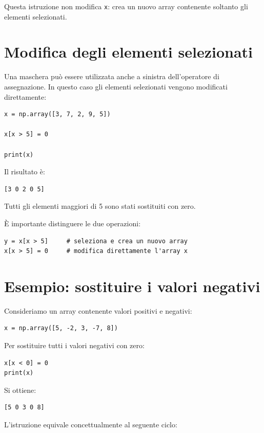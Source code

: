 \documentclass[11pt,a4paper]{book}
\begin{document}
Questa istruzione non modifica \texttt{x}: crea un nuovo array contenente soltanto gli elementi selezionati.

\section{Modifica degli elementi selezionati}

Una maschera può essere utilizzata anche a sinistra dell'operatore di assegnazione. In questo caso gli elementi selezionati vengono modificati direttamente:

\begin{lstlisting}
x = np.array([3, 7, 2, 9, 5])

x[x > 5] = 0

print(x)
\end{lstlisting}

Il risultato è:

\begin{lstlisting}
[3 0 2 0 5]
\end{lstlisting}

Tutti gli elementi maggiori di 5 sono stati sostituiti con zero.

È importante distinguere le due operazioni:

\begin{lstlisting}
y = x[x > 5]     # seleziona e crea un nuovo array
x[x > 5] = 0     # modifica direttamente l'array x
\end{lstlisting}

\section{Esempio: sostituire i valori negativi}

Consideriamo un array contenente valori positivi e negativi:

\begin{lstlisting}
x = np.array([5, -2, 3, -7, 8])
\end{lstlisting}

Per sostituire tutti i valori negativi con zero:

\begin{lstlisting}
x[x < 0] = 0
print(x)
\end{lstlisting}

Si ottiene:

\begin{lstlisting}
[5 0 3 0 8]
\end{lstlisting}

L'istruzione equivale concettualmente al seguente ciclo:
\end{document}
